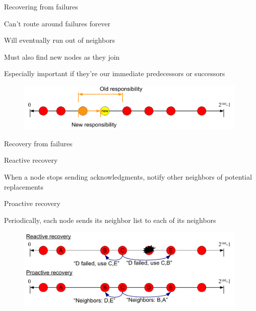 \begin{frame}{Recovering from failures}

\BIL
\item Can't route around failures forever 
	\BI
	\item Will eventually run out of neighbors
	\EI
\item Must also find new nodes as they join
	\BI
	\item Especially important if they're our immediate predecessors or successors
	\EI
\EIL

\begin{figure}
	\includegraphics[width=\textwidth]{figs/10/dht-recovery}
\end{figure}

\end{frame}

\begin{frame}{Recovery from failures}

\BIL
\item \alert{Reactive recovery}
\BI
\item When a node stops sending acknowledgments, notify other neighbors of potential replacements
\EI
\item \alert{Proactive recovery}
\BI
\item Periodically, each node sends its neighbor list to each of its neighbors
\EI
\EIL

\begin{figure}
	\includegraphics[width=\textwidth]{figs/10/dht-repair}
\end{figure}

\end{frame}

